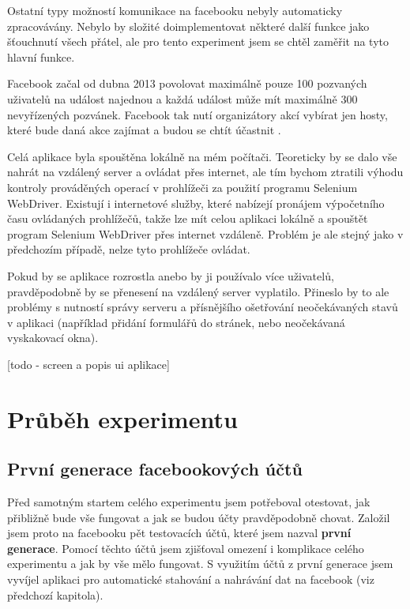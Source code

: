 \documentclass[thesis=M,czech]{FITthesis}[2013/05/10]
\begin{document}
Ostatní typy možností komunikace na facebooku nebyly automaticky zpracovávány. Nebylo by složité doimplementovat některé další funkce jako šťouchnutí všech přátel, ale pro tento experiment jsem se chtěl zaměřit na tyto hlavní funkce. 

Facebook začal od dubna 2013 povolovat maximálně pouze 100 pozvaných uživatelů na událost najednou a každá událost může mít maximálně 300 nevyřízených pozvánek. Facebook tak nutí organizátory akcí vybírat jen hosty, které bude daná akce zajímat a budou se chtít účastnit \cite{fbEventsLimit} \cite{fbEventsLimitHelpCenter}.

Celá aplikace byla spouštěna lokálně na mém počítači. Teoreticky by se dalo vše nahrát na vzdálený server a ovládat přes internet, ale tím bychom ztratili výhodu kontroly prováděných operací v prohlížeči za použití programu Selenium WebDriver. Existují i internetové služby, které nabízejí pronájem výpočetního času ovládaných prohlížečů, takže lze mít celou aplikaci lokálně a spouštět program Selenium WebDriver přes internet vzdáleně. Problém je ale stejný jako v předchozím případě, nelze tyto prohlížeče ovládat.

Pokud by se aplikace rozrostla anebo by ji používalo více uživatelů, pravděpodobně by se přenesení na vzdálený server vyplatilo. Přineslo by to ale problémy s nutností správy serveru a přísnějšího ošetřování neočekávaných stavů v aplikaci (například přidání formulářů do stránek, nebo neočekávaná vyskakovací okna).

[todo - screen a popis ui aplikace]



\chapter{Průběh experimentu}

\section{První generace facebookových účtů}

Před samotným startem celého experimentu jsem potřeboval otestovat, jak přibližně bude vše fungovat a jak se budou účty pravděpodobně chovat. Založil jsem proto na facebooku pět testovacích účtů, které jsem nazval \textbf{první generace}. Pomocí těchto účtů jsem zjišťoval omezení i komplikace celého experimentu a jak by vše mělo fungovat. S využitím účtů z první generace jsem vyvíjel aplikaci pro automatické stahování a nahrávání dat na facebook (viz předchozí kapitola).
\end{document}
